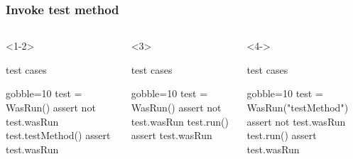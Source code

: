 \documentclass[lualatex]{beamer}
\begin{document}
\begin{frame}[fragile,t]
  \frametitle{Invoke test method}

  \begin{columns}[t]
    \small
    \begin{onlyenv}<1-2>
      \begin{block}{test cases}
        \begin{pythoncode*}{gobble=10}
          test = WasRun()
          assert not test.wasRun
          test.testMethod()
          assert test.wasRun
        \end{pythoncode*}
      \end{block}
    \end{onlyenv}
    \begin{onlyenv}<3>
      \begin{block}{test cases}
        \begin{pythoncode*}{gobble=10}
          test = WasRun()
          assert not test.wasRun
          test.run()
          assert test.wasRun
        \end{pythoncode*}
      \end{block}
    \end{onlyenv}
    \begin{onlyenv}<4->
      \begin{block}{test cases}
        \begin{pythoncode*}{gobble=10}
          test = WasRun("testMethod")
          assert not test.wasRun
          test.run()
          assert test.wasRun
        \end{pythoncode*}
      \end{block}
    \end{onlyenv}
    

\end{columns}
\end{frame}
\end{document}
